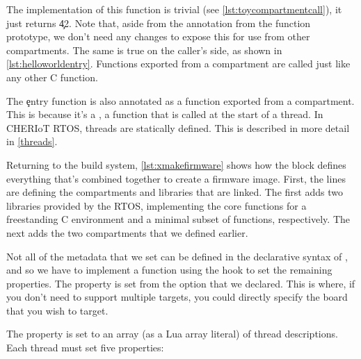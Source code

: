 \codelisting[filename=examples/hello_world/compartment.hh,marker=export,label=lst:helloexport,caption="Exporting a function for use by other compartments"]{}

The implementation of this function is trivial (see \ref{lst:toycompartmentcall}), it just returns \c{42}.
Note that, aside from the annotation from the function prototype, we don't need any changes to expose this for use from other compartments.
The same is true on the caller's side, as shown in \ref{lst:helloworldentry}.
Functions exported from a compartment are called just like any other C function.

\codelisting[filename=examples/hello_world/compartment.cc,marker=all,label=lst:toycompartmentcall,caption="A trivial implementation of an exported function"]{}

\codelisting[filename=examples/hello_world/hello.cc,marker=entry,label=lst:helloworldentry,caption="A simple compartment entry point that does a cross-compartment call"]{}

The \c{entry} function is also annotated as a function exported from a compartment.
This is because it's a , a function that is called at the start of a thread.
In CHERIoT RTOS, threads are statically defined.
This is described in more detail in \ref{threads}.

Returning to the build system, \ref{lst:xmakefirmware} shows how the  block defines everything that's combined together to create a firmware image.
First, the  lines are defining the compartments and libraries that are linked.
The first  adds two libraries provided by the RTOS, implementing the core functions for a freestanding C environment and a minimal subset of  functions, respectively.
The next  adds the two compartments that we defined earlier.

Not all of the metadata that we set can be defined in the declarative syntax of , and so we have to implement a function using the  hook to set the remaining properties.
The  property is set from the option that we declared.
This is where, if you don't need to support multiple targets, you could directly specify the board that you wish to target.

\lualisting[filename=examples/hello_world/xmake.lua,marker=firmware,label=lst:xmakefirmware,caption="Build system code for linking the final firmware image"]{}

The  property is set to an array (as a Lua array literal) of thread descriptions.
Each thread must set five properties:

